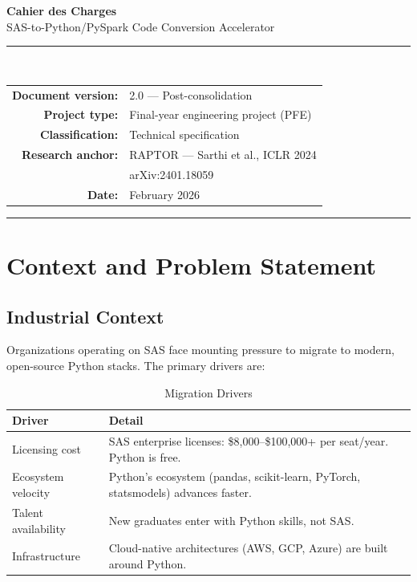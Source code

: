 \documentclass[11pt,a4paper]{article}
\begin{document}
\begin{titlepage}
\centering
\vspace*{2cm}

{\Huge\bfseries\textcolor{primary}{Cahier des Charges}\\[0.5cm]}
{\LARGE\textcolor{accent}{SAS-to-Python/PySpark Code Conversion Accelerator}\\[1.5cm]}

\textcolor{accent}{\rule{0.6\textwidth}{1.2pt}}\\[1.5cm]

\begin{tabular}{rl}
    \textbf{Document version:} & 2.0 — Post-consolidation \\[4pt]
    \textbf{Project type:} & Final-year engineering project (PFE) \\[4pt]
    \textbf{Classification:} & Technical specification \\[4pt]
    \textbf{Research anchor:} & RAPTOR — Sarthi et al., ICLR 2024 \\
    & arXiv:2401.18059 \\[4pt]
    \textbf{Date:} & February 2026 \\
\end{tabular}

\vfill
\textcolor{accent}{\rule{0.6\textwidth}{0.4pt}}
\end{titlepage}

\tableofcontents
\newpage

\section{Context and Problem Statement}

\subsection{Industrial Context}

Organizations operating on SAS face mounting pressure to migrate to modern, open-source Python stacks. The primary drivers are:

\begin{table}[H]
\centering
\caption{Migration Drivers}
\begin{tabularx}{\textwidth}{@{} l X @{}}
\toprule
\textbf{Driver} & \textbf{Detail} \\
\midrule
Licensing cost & SAS enterprise licenses: \$8,000–\$100,000+ per seat/year. Python is free. \\
Ecosystem velocity & Python's ecosystem (pandas, scikit-learn, PyTorch, statsmodels) advances faster. \\
Talent availability & New graduates enter with Python skills, not SAS. \\
Infrastructure & Cloud-native architectures (AWS, GCP, Azure) are built around Python. \\
\bottomrule
\end{tabularx}
\end{table}
\end{document}
